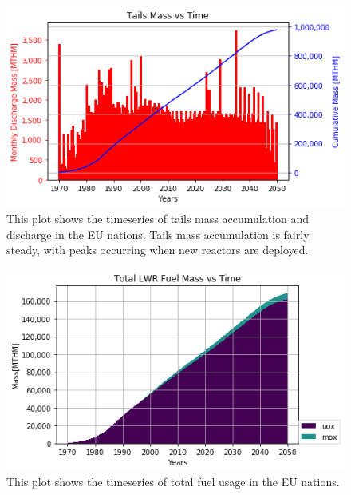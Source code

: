 \begin{figure}[htbp!]
	\begin{center}
		\includegraphics[scale=0.7]{./images/eu_future/tails.png}
	\end{center}
	\caption{This plot shows the timeseries of tails mass accumulation and discharge in the \gls{EU} nations.
			 Tails mass accumulation is fairly steady, with peaks occurring when
			 new reactors are deployed.}
	\label{fig:eu_tail}
\end{figure}

\begin{figure}[htbp!]
	\begin{center}
		\includegraphics[scale=0.7]{./images/eu_future/total_fuel.png}
	\end{center}
	\caption{This plot shows the timeseries of total fuel usage in the \gls{EU} nations.}
	\label{fig:eu_fuel}
\end{figure}


